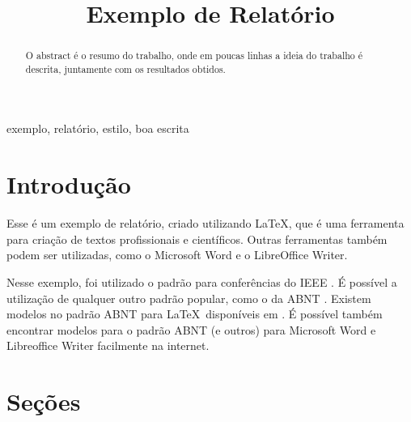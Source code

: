 \documentclass[conference]{IEEEtran}
\begin{document}
\begin{acronym}[TDMA]
\end{acronym}

\newlength\figureheight
\newlength\figurewidth


\title{Exemplo de Relatório}

\author{
}

\maketitle

\begin{abstract}
O abstract é o resumo do trabalho, onde em poucas linhas a ideia do trabalho é descrita, juntamente com os resultados obtidos.
\end{abstract}

\begin{IEEEkeywords}
exemplo, relatório, estilo, boa escrita
\end{IEEEkeywords}

\section{Introdução}

Esse é um exemplo de relatório, criado utilizando \LaTeX, que é uma ferramenta para criação de textos profissionais e científicos. Outras ferramentas também podem ser utilizadas, como o Microsoft Word e o LibreOffice Writer.

Nesse exemplo, foi utilizado o padrão para conferências do \ac{IEEE} \cite{ieee2022}. É possível a utilização de qualquer outro padrão popular, como o da \ac{ABNT} \cite{abnt2022}. Existem modelos no padrão \ac{ABNT} para \LaTeX\ disponíveis em \cite{abntex2022}. É possível também encontrar modelos para o padrão \ac{ABNT} (e outros) para Microsoft Word e Libreoffice Writer facilmente na internet.

\section{Seções}
\end{document}
